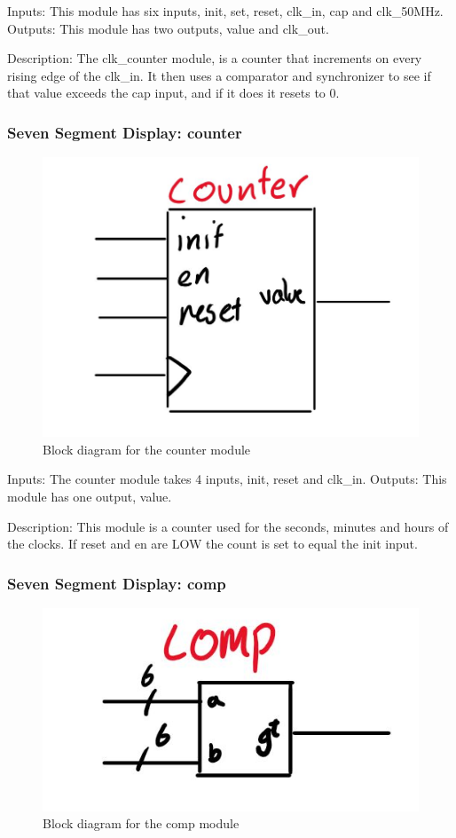 \documentclass[a4paper]{article}
\begin{document}
Inputs: This module has six inputs, init, set, reset, clk_in, cap and clk_50MHz.
Outputs: This module has two outputs, value and clk_out.

Description: The clk_counter module, is a counter that increments on every rising edge of the clk_in. It then uses a comparator and synchronizer to see if that value exceeds the cap input, and if it does it resets to 0.

\subsubsection{Seven Segment Display: counter}
\begin{figure}[H]
    \includegraphics[width=0.8 \linewidth]{images/counter.JPG}
    \caption{Block diagram for the counter module}
    \label{counter}
\end{figure}

Inputs: The counter module takes 4 inputs, init, reset and clk_in.
Outputs: This module has one output, value.

Description: This module is a counter used for the seconds, minutes and hours of the clocks. If reset and en are LOW the count is set to equal the init input.

\subsubsection{Seven Segment Display: comp}
\begin{figure}[H]
    \includegraphics[width=0.8 \linewidth]{images/comp.JPG}
    \caption{Block diagram for the comp module}
    \label{comp}
\end{figure}
\end{document}
